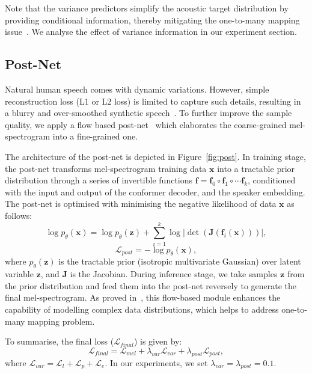 \documentclass[letterpaper]{article} %
\begin{document}
Note that the variance predictors simplify the acoustic target distribution by providing conditional information, thereby mitigating the one-to-many mapping issue~\cite{ren2022revisiting}.
We analyse the effect of variance information in our experiment section.



\subsection{Post-Net}
Natural human speech comes with dynamic variations. However, simple reconstruction loss (L1 or L2 loss) is limited to capture such details, resulting in a blurry and over-smoothed synthetic speech~\cite{liu2022diffsinger}.
To further improve the sample quality, we apply a flow based post-net~\cite{ren2021portaspeech} which elaborates the coarse-grained mel-spectrogram into a fine-grained one.

The architecture of the post-net is depicted in Figure~\ref{fig:post}. In training stage, the post-net transforms mel-spectrogram training data $\boldsymbol{x}$ into a tractable prior distribution through a series of invertible functions $\mathbf{f}=\mathbf{f}_0\circ\mathbf{f}_1\circ\cdots\mathbf{f}_k$, conditioned with the input and output of the conformer decoder, and the speaker embedding. The post-net is optimised with minimising the negative likelihood of data $\boldsymbol{x}$ as follows:
\begin{equation}
\log p_{\theta}(\boldsymbol{x}) = \log p_{\theta}(\boldsymbol{z}) + \sum_{i=1}^{k}\log |\det(\boldsymbol{J}(\mathbf{f}_i(\boldsymbol{x})))|,
\end{equation}
\begin{equation}
\mathcal{L}_{post} = - \log p_{\theta}(\boldsymbol{x}),
\end{equation}
where $p_{\theta}(\boldsymbol{z})$ is the tractable prior (isotropic multivariate Gaussian) over latent variable $\boldsymbol{z}$, and $\boldsymbol{J}$ is the Jacobian. During inference stage, we take samples $\boldsymbol{z}$ from the prior distribution and feed them into the post-net reversely to generate the final mel-spectrogram. As proved in~\cite{ren2022revisiting}, this flow-based module enhances the capability of modelling complex data distributions, which helps to address one-to-many mapping problem.

To summarise, the final loss ($\mathcal{L}_{final}$) is given by:
\begin{equation}
\mathcal{L}_{final} = \mathcal{L}_{mel} + \lambda_{var}\mathcal{L}_{var} + \lambda_{post}\mathcal{L}_{post},
\end{equation}
where $\mathcal{L}_{var}=\mathcal{L}_{l}+\mathcal{L}_{p}+\mathcal{L}_{e}$. In our experiments, we set $\lambda_{var} = \lambda_{post} = 0.1$.
\end{document}
